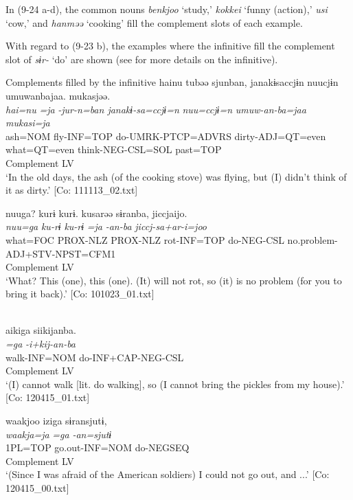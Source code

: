 In (9-24 a-d), the common nouns \textit{benkjoo} ‘study,’ \textit{kokkei} ‘funny (action),’ \textit{usi} ‘cow,’ and \textit{hanməə} ‘cooking’ fill the complement slots of each example.

With regard to (9-23 b), the examples where the infinitive fill the complement slot of \textit{sɨr-} ‘do’ are shown (see  for more details on the infinitive).

\ea   Complements filled by the infinitive \label{ex:9.25}
\ea \label{ex:9.25a}%
 \gllll  hainu  tubəə  sjunban,  janakɨsaccjɨn  nuucjɨn  umuwanbajaa.  mukasjəə.\\
      \textit{hai=nu}  \textit{=ja}  \textit{-jur-n=ban  janakɨ-sa=ccjɨ=n}    \textit{nuu=ccjɨ=n}  \textit{umuw-an-ba=jaa}  \textit{mukasi=ja}\\
      ash=NOM  fly-INF=TOP  do-UMRK-PTCP=ADVRS  dirty-ADJ=QT=even  what=QT=even  think-NEG-CSL=SOL  past=TOP\\
        Complement  LV      \\
    \glt       ‘In the old days, the ash (of the cooking stove) was flying, but (I) didn’t think of it as dirty.’ [Co: 111113\_02.txt]

\ex \label{ex:9.25b} %
    \gllll  nuuga?  kurɨ  kurɨ.  kusarəə  sɨranba,   jiccjaijo.\\
      \textit{nuu=ga}  \textit{ku-rɨ}  \textit{ku-rɨ}  \textit{=ja}  \textit{-an-ba}   \textit{jiccj-sa+ar-i=joo}\\
      what=FOC  PROX-NLZ  PROX-NLZ  rot-INF=TOP  do-NEG-CSL   no.problem-ADJ+STV-NPST=CFM1\\
            Complement  LV\\
    \glt       ‘What? This (one), this (one). (It) will not rot, so (it) is no problem (for you to bring it back).’ [Co: 101023\_01.txt]

\ex\label{ex:9.25c}\relax [= (6-49)]\\
    \gllll  aikiga  siikijanba.\\
      \textit{=ga}  \textit{-i+kij-an-ba}\\
      walk-INF=NOM  do-INF+CAP-NEG-CSL\\
      Complement  LV\\
    \glt       ‘(I) cannot walk [lit. do walking], so (I cannot bring the pickles from my house).’ [Co: 120415\_01.txt]

\ex \label{ex:9.25d} %
    \gllll  waakjoo  iziga  sɨransjutɨ,\\
      \textit{waakja=ja}  \textit{=ga}  \textit{-an=sjutɨ}\\
      1PL=TOP  go.out-INF=NOM  do-NEGSEQ\\
        Complement  LV\\
    \glt       ‘(Since I was afraid of the American soldiers) I could not go out, and ...’ [Co: 120415\_00.txt]
    \z
\z

